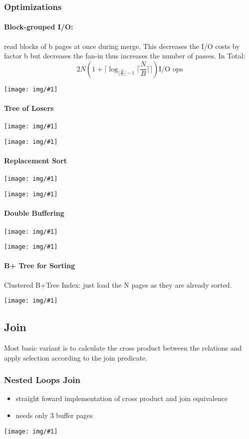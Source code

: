 \documentclass[a4paper]{article}
\newcommand{\img}[1]{\begin{center}
    \texttt{[image: img/\#1]}
\end{center} }
\begin{document}
\begin{twocolumn}
\subsubsection{Optimizations}
\paragraph{Block-grouped I/O:} read blocks of b pages at once during merge. This decreases the I/O costs by factor b but decreases the fan-in thus increases the number of passes. In Total:
\[ 2 N (1+ \lceil \log_{\lfloor \frac{B}{b}\rfloor-1} \lceil \frac{N}{B}\rceil\rceil) \text{I/O ops}\]

\img{blocked_io.png}

\paragraph{Tree of Losers}
\img{tree_of_losers_algo.png}
\img{tree_of_losers_ex.png}

\paragraph{Replacement Sort}
\img{replacement_sort_algo.png}
\img{replacement_sort_graph}

\paragraph{Double Buffering}
\img{double_buffering_algo.png}
\img{double_buffering_graph.png}

\paragraph{B+ Tree for Sorting}
Clustered B+Tree Index: just load the N pages as they are already sorted. \\
\img{b+tree_sort.png}

\subsection{Join}
Most basic variant is to calculate the cross product between the relations and apply selection according to the join predicate.

\subsubsection{Nested Loops Join}
\begin{itemize}
	\item straight foward implementation of cross product and join equivalence
	\item needs only 3 buffer pages
\end{itemize}
\img{nlj_algo}



\end{twocolumn}
\end{document}
